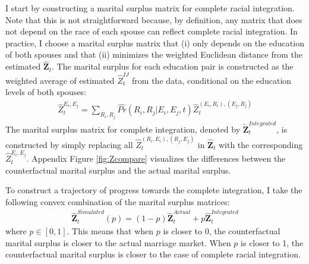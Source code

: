 I start by constructing a marital surplus matrix for complete racial integration. Note that this is not straightforward because, by definition, any matrix that does not depend on the race of each spouse can reflect complete racial integration. In practice, I choose a marital surplus matrix that (i) only depends on the education of both spouses and that (ii) minimizes the weighted Euclidean distance from the estimated $\hat{\mathbf{Z}}_{t}$. The marital surplus for each education pair is constructed as the weighted average of estimated $\hat{Z}^{IJ}_t$ from the data, conditional on the education levels of both spouses:  
\begin{align}
	\hat{Z}^{E_i, E_j}_t = \sum_{R_i, R_j}\widehat{Pr}( R_i, R_j | E_i, E_j, t)  \hat{Z}^{(E_i, R_i), (E_j, R_j)}_t 
\end{align}
The marital surplus matrix for complete integration, denoted by $\mathbf{\tilde{Z}}^{Integrated}_t$, is constructed by simply replacing all $\hat{Z}^{(R_i, E_i), (R_j, E_j)}_t$ in $\mathbf{\hat{Z}}_t$ with the corresponding $\hat{Z}^{E_i, E_j}_t$. Appendix Figure \ref{fig:Zcompare} visualizes the differences between the counterfactual marital surplus and the actual marital surplus. 

To construct a trajectory of progress towards the complete integration, I take the following convex combination of the marital surplus matrices:
\begin{align}
	\mathbf{\hat{Z}}^{Simulated}_t(p) = (1-p)\mathbf{\hat{Z}}^{Actual}_t + p\mathbf{\hat{Z}}^{Integrated}_t
\end{align}
where $p \in [0,1]$. This means that when $p$ is closer to 0, the counterfactual marital surplus is closer to the actual marriage market. When $p$ is closer to 1, the counterfactual marital surplus is closer to the case of complete racial integration.



%






